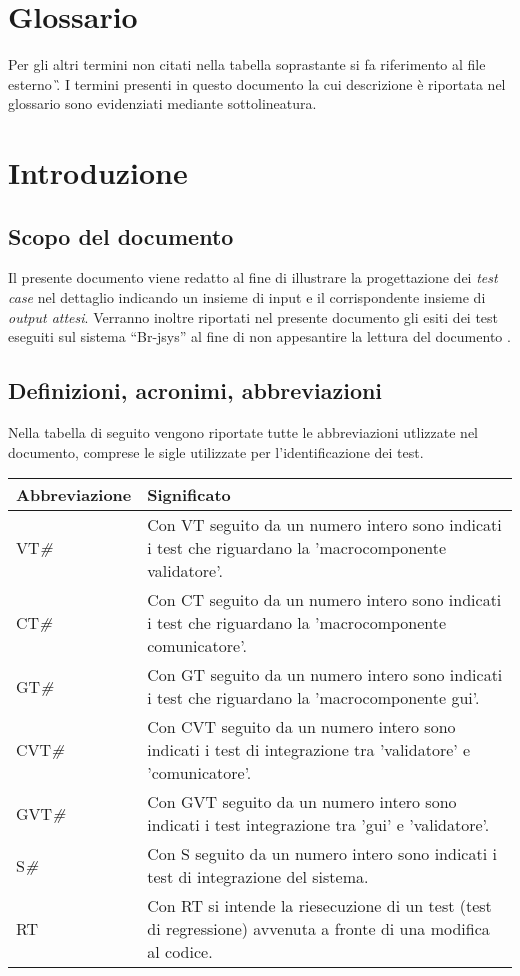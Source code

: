 \chapter*{Glossario}
Per gli altri termini non citati nella tabella soprastante si fa riferimento al file esterno \G. I termini presenti in questo documento la cui descrizione \`e riportata nel glossario sono evidenziati mediante sottolineatura.

\chapter{Introduzione}

\section{Scopo del documento}
Il presente documento viene redatto al fine di illustrare la progettazione dei \textit{test case} nel dettaglio indicando un insieme di input e il corrispondente insieme di \textit{output attesi}. Verranno inoltre riportati nel presente documento gli esiti dei test eseguiti sul sistema ``Br-jsys'' al fine di non appesantire la lettura del documento \PdQ .

\section{Definizioni, acronimi, abbreviazioni}
Nella tabella di seguito vengono riportate tutte le abbreviazioni utlizzate nel documento, comprese le sigle utilizzate per l'identificazione dei test.
\begin{center}
\begin{tabular}{|p{3.0cm}|p{8.5cm}|} \hline
\textbf{Abbreviazione} & \textbf{Significato} \\ \hline

VT\textit{\#} & Con VT seguito da un numero intero sono indicati i test che riguardano la 'macrocomponente validatore'.\\ \hline
CT\textit{\#} & Con CT seguito da un numero intero sono indicati i test che riguardano la 'macrocomponente comunicatore'.\\ \hline
GT\textit{\#} & Con GT seguito da un numero intero sono indicati i test che riguardano la 'macrocomponente gui'.\\ \hline
CVT\textit{\#} & Con CVT seguito da un numero intero sono indicati i test di integrazione tra 'validatore' e 'comunicatore'.\\ \hline
GVT\textit{\#} & Con GVT seguito da un numero intero sono indicati i test integrazione tra 'gui' e 'validatore'.\\ \hline
S\textit{\#} & Con S seguito da un numero intero sono indicati i test di integrazione del sistema.\\ \hline
RT\textit{} & Con RT si intende la riesecuzione di un test (test di regressione) avvenuta a fronte di una modifica al codice.\\ \hline

\end{tabular} \\
\end{center}

